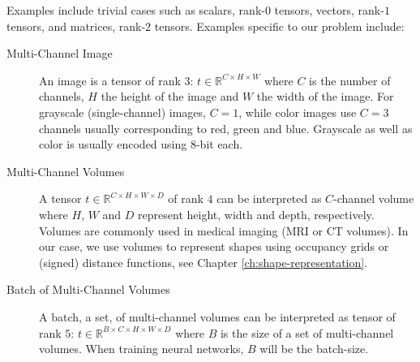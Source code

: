 \begin{example}
  Examples include trivial cases such as scalars, \ie rank-$0$ tensors, vectors,
  \ie rank-$1$ tensors, and matrices, \ie rank-$2$ tensors. Examples specific to
  our problem include:
  \begin{description}
    \item[Multi-Channel Image] An image is a tensor of rank $3$:
    $t \in \mathbb{R}^{C \times H \times W}$ where $C$ is the number of channels,
    $H$ the height of the image and $W$ the width of the image.
    For grayscale (\ie single-channel) images, $C = 1$, while color images use
    $C = 3$ channels usually corresponding to red, green and blue. Grayscale as
    well as color is usually encoded using 8-bit each.
    \item[Multi-Channel Volumes] A tensor $t \in \mathbb{R}^{C \times H \times W \times D}$
    of rank $4$ can be interpreted as $C$-channel volume where $H$, $W$ and $D$ represent
    height, width and depth, respectively.
    Volumes are commonly used in medical imaging (\ie MRI or CT volumes). In our case,
    we use volumes to represent shapes using occupancy grids or (signed)
    distance functions, see Chapter \ref{ch:shape-representation}.
    \item[Batch of Multi-Channel Volumes] A batch, \ie a set, of multi-channel volumes
    can be interpreted as tensor of rank $5$:
    $t \in \mathbb{R}^{B \times C \times H \times W \times D}$ where $B$ is
    the size of a set of multi-channel volumes. When training neural networks,
    $B$ will be the batch-size.
  \end{description}
\end{example}


